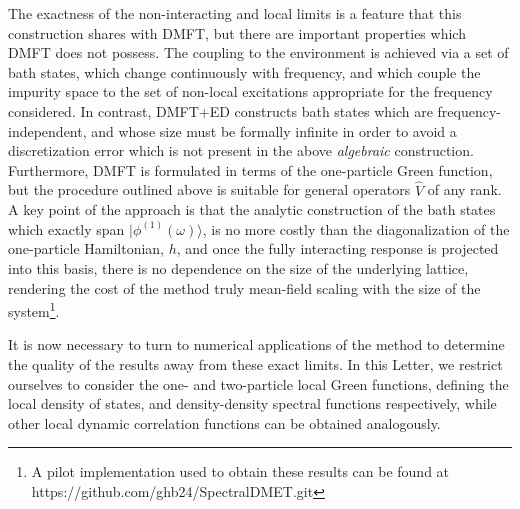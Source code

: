 \documentclass[aps,twocolumn,nobibnotes]{revtex4}
\begin{document}
The exactness of the non-interacting and local limits is a feature that this construction shares with DMFT, but there are important properties which 
DMFT does not possess. The coupling to the environment
is achieved via a set of bath states, which change continuously with frequency, and which couple the impurity space to the set of non-local excitations appropriate for the frequency considered. 
In contrast, DMFT+ED constructs bath states which are
frequency-independent, and whose size must be formally infinite in order to avoid a discretization error which is not present in the above {\em algebraic} 
construction. Furthermore, DMFT is formulated in terms of the one-particle Green function, but the procedure outlined above is suitable for 
general operators ${\hat V}$ of any rank. 
A key point of the approach is that the analytic construction
of the bath states which exactly span $|\phi^{(1)}(\omega) \rangle$, is no more costly than the diagonalization of the one-particle Hamiltonian, $h$, 
and once the fully interacting response is projected into this basis, there is no dependence on the size of the underlying lattice, rendering 
the cost of the method truly mean-field scaling with the size of the system\footnote{A pilot implementation used to obtain these results can be found at https://github.com/ghb24/SpectralDMET.git}. 

It is now necessary to turn to numerical applications of the method to determine the quality of the results away from these exact limits. 
In this Letter, we restrict ourselves to consider the one- and two-particle local Green functions,
defining the local density of states, and density-density spectral functions respectively, while other local dynamic correlation functions can be obtained analogously.
\end{document}
